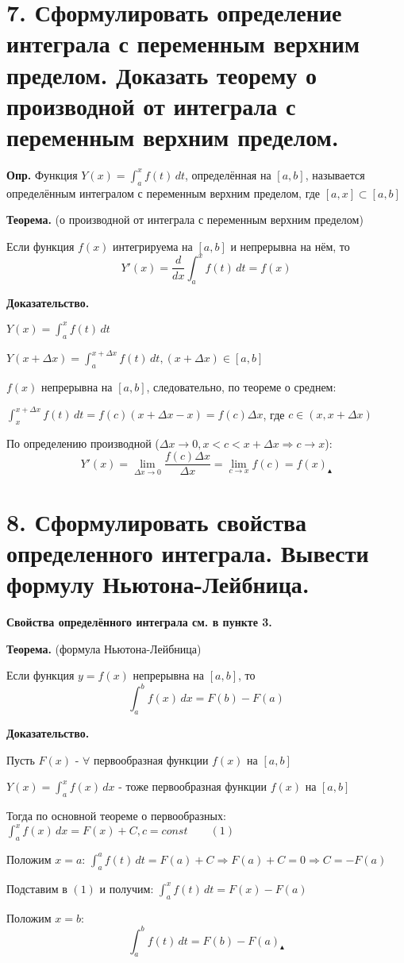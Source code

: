 \documentclass[11pt]{article}
\begin{document}
\section*{7. Сформулировать определение интеграла с переменным верхним пределом. Доказать теорему о производной от интеграла с переменным верхним пределом.}
\par\textbf{Опр.} Функция $ {Y(x) = \int_a^x f(t) \, dt}$, определённая на $[a, b]$, называется определённым интегралом с переменным верхним пределом, где $[a, x] \subset [a, b]$
\par\textbf{Теорема.} (о производной от интеграла с переменным верхним пределом)
\par Если функция $f(x)$ интегрируема на $[a, b]$ и непрерывна на нём, то $$Y'(x) = \frac{d}{dx} \int_{a}^x f(t) \, dt = f(x)$$
\par\textbf{Доказательство.}
\par $Y(x) = \int_{a}^x f(t) \, dt$
\par $Y(x + \Delta x) = \int_{a}^{x + \Delta x} f(t) \, dt, (x + \Delta x) \in [a, b]$
\par $f(x)$ непрерывна на $[a, b]$, следовательно, по теореме о среднем:
\par $\int_{x}^{x + \Delta x} f(t) \, dt = f(c) (x + \Delta x - x) = f(c) \Delta x$, где $c \in (x, x + \Delta x)$
\par По определению производной ($\Delta x \to 0, x < c < x + \Delta x \Rightarrow c \to x$):
$$Y'(x) = \lim_{\Delta x \to 0} \frac{{f(c) \Delta x}}{\Delta x} = \lim_{ c \to x } f(c) = f(x) _\blacktriangle$$

\section*{8. Сформулировать свойства определенного интеграла. Вывести формулу Ньютона-Лейбница.}
\par\textbf{Свойства определённого интеграла см. в пункте 3.}
\par\textbf{Теорема.} (формула Ньютона-Лейбница)
\par Если функция $y = f(x)$ непрерывна на $[a, b]$, то $$\int_{a}^b f(x) \, dx = F(b) - F(a)$$
\par\textbf{Доказательство.}
\par Пусть $F(x)$ - $\forall$ первообразная функции $f(x)$ на $[a, b]$
\par $Y(x) = \int_{a}^x f(x) \, dx$ - тоже первообразная функции $f(x)$ на $[a, b]$
\par Тогда по основной теореме о первообразных: $\int_{a}^x f(x) \, dx = F(x) + C, c =const \qquad(1)$
\par Положим $x = a$: $\int_{a}^a f(t) \, dt = F(a) + C \Rightarrow F(a) + C = 0 \Rightarrow C = -F(a)$
\par Подставим в $(1)$ и получим: $\int_{a}^x f(t) \, dt = F(x) - F(a)$
\par Положим $x = b$: $$\int_{a}^b f(t) \, dt = F(b) - F(a) _{\blacktriangle}$$
\end{document}
